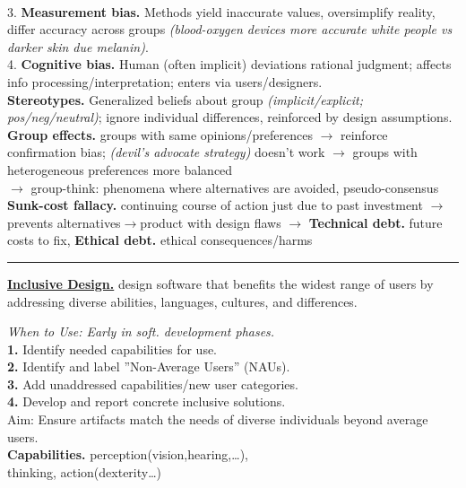 \documentclass[8pt, a4paper]{extarticle}
\makeatletter
\renewcommand{\hline}{\noalign{\vskip 2px}\hrule\@height\arrayrulewidth\@width\linewidth\noalign{\vskip 2px}}
\makeatother
\begin{document}
\begin{minipage}[t]{0.49\textwidth}
{\begin{minipage}[t]{1\textwidth}
\begin{minipage}[htp]{0.59\textwidth}
			\end{minipage}\\
			3. \textbf{Measurement bias.} Methods yield inaccurate values, oversimplify reality, differ accuracy across groups \textit{(blood-oxygen devices more accurate white people vs darker skin due melanin)}.\\
			4. \textbf{Cognitive bias.} Human (often implicit) deviations rational judgment; affects info processing/interpretation; enters via users/designers.\\
			\textbf{Stereotypes.} Generalized beliefs about group \textit{(implicit/explicit; pos/neg/neutral)}; ignore individual differences, reinforced by design assumptions.\\
			\textbf{Group effects.} groups with same opinions/preferences $\to$ reinforce confirmation bias; \textit{(devil's advocate strategy)} doesn't work $\to$ groups with heterogeneous preferences more balanced\\
			$\to$ group-think: phenomena where alternatives are avoided, pseudo-consensus\\
			\textbf{Sunk-cost fallacy.} continuing course of action just due to past investment $\to$ prevents alternatives$\to$product with design flaws
			$\to$ \textbf{Technical debt.} future costs to fix, \textbf{Ethical debt.} ethical consequences/harms\hline
			\ul{\textbf{Inclusive Design.}} design software that benefits the widest range of users by addressing diverse abilities, languages, cultures, and differences.\\
			\begin{minipage}[t]{0.49\textwidth}
				\textit{When to Use: Early in soft. development phases.}\\
				\textbf{1.} Identify needed capabilities for use.\\
				\textbf{2.} Identify and label ”Non-Average Users” (NAUs).\\
				\textbf{3.} Add unaddressed capabilities/new user categories.\\
				\textbf{4.} Develop and report concrete inclusive solutions.\\
				Aim: Ensure artifacts match the needs of diverse individuals beyond average users.\\
				\textbf{Capabilities.} perception(vision,hearing,\ldots),\\ thinking, action(dexterity\dots)
			\end{minipage}\hfill\vline\hfill
			\begin{minipage}[t]{0.5\textwidth}

\end{minipage}
\end{minipage}}
\end{minipage}
\end{document}
